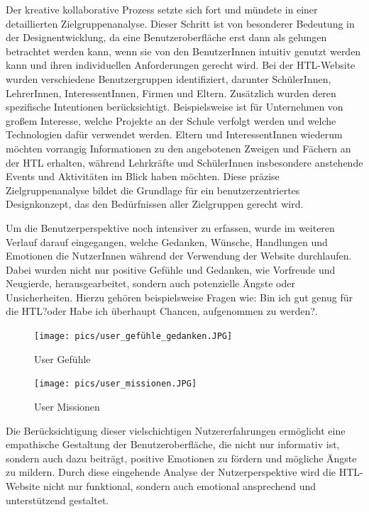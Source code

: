 Der kreative kollaborative Prozess setzte sich fort und mündete in einer detaillierten Zielgruppenanalyse. 
Dieser Schritt ist von besonderer Bedeutung in der Designentwicklung, da eine Benutzeroberfläche erst dann als gelungen betrachtet werden kann, 
wenn sie von den BenutzerInnen intuitiv genutzt werden kann und ihren individuellen Anforderungen gerecht wird. 
Bei der HTL-Website wurden verschiedene Benutzergruppen identifiziert, darunter SchülerInnen, LehrerInnen, InteressentInnen, Firmen und Eltern. 
Zusätzlich wurden deren spezifische Intentionen berücksichtigt. Beispielsweise ist für Unternehmen von großem Interesse, 
welche Projekte an der Schule verfolgt werden und welche Technologien dafür verwendet werden. 
Eltern und InteressentInnen wiederum möchten vorrangig Informationen zu den angebotenen Zweigen und Fächern an der HTL erhalten, 
während Lehrkräfte und SchülerInnen insbesondere anstehende Events und Aktivitäten im Blick haben möchten. 
Diese präzise Zielgruppenanalyse bildet die Grundlage für ein benutzerzentriertes Designkonzept, das den Bedürfnissen aller Zielgruppen gerecht wird.


Um die Benutzerperspektive noch intensiver zu erfassen, wurde im weiteren Verlauf darauf eingegangen, 
welche Gedanken, Wünsche, Handlungen und Emotionen die NutzerInnen während der Verwendung der Website durchlaufen. 
Dabei wurden nicht nur positive Gefühle und Gedanken, wie Vorfreude und Neugierde, herausgearbeitet, sondern auch potenzielle Ängste oder Unsicherheiten. 
Hierzu gehören beispielsweise Fragen wie: \glqq Bin ich gut genug für die HTL?\grqq oder \grqq Habe ich überhaupt Chancen, aufgenommen zu werden?\grqq.

\begin{figure}
    \begin{minipage}[b]{.4\linewidth} 
       \texttt{[image: pics/user\_gefühle\_gedanken.JPG]}
       \caption{User Gefühle}
    \end{minipage}
    \hspace{.05\linewidth}
    \begin{minipage}[b]{.4\linewidth}
       \texttt{[image: pics/user\_missionen.JPG]}
       \caption{User Missionen}
    \end{minipage}
 \end{figure}

Die Berücksichtigung dieser vielschichtigen Nutzererfahrungen ermöglicht eine empathische Gestaltung der Benutzeroberfläche, 
die nicht nur informativ ist, sondern auch dazu beiträgt, positive Emotionen zu fördern und mögliche Ängste zu mildern. 
Durch diese eingehende Analyse der Nutzerperspektive wird die HTL-Website nicht nur funktional, sondern auch emotional ansprechend und unterstützend gestaltet.

